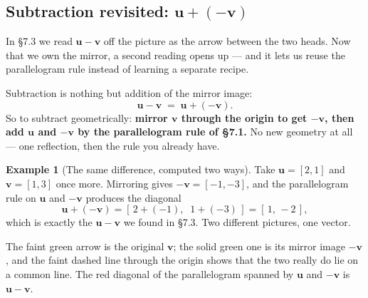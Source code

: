 \documentclass[11pt]{article}
\theoremstyle{definition}
\newtheorem{ex}{Example}
\theoremstyle{remark}
\newcommand{\vc}[1]{\mathbf{#1}}
\newcommand{\lattice}[4]{%
  \draw[step=1cm,gray!25,very thin] (#1,#3) grid (#2,#4);
  \draw[axisline] (#1,0) -- (#2+0.45,0) node[right,font=\scriptsize,black]{$x$};
  \draw[axisline] (0,#3) -- (0,#4+0.45) node[above,font=\scriptsize,black]{$y$};
}
\begin{document}
\subsection{Subtraction revisited: \texorpdfstring{$\vc{u}+(-\vc{v})$}{u + (-v)}}
In \S7.3 we read $\vc{u}-\vc{v}$ off the picture as the arrow between the two
heads. Now that we own the mirror, a second reading opens up --- and it lets us
reuse the parallelogram rule instead of learning a separate recipe.

Subtraction is nothing but addition of the mirror image:
\[
  \vc{u}-\vc{v} \;=\; \vc{u}+(-\vc{v}).
\]
So to subtract geometrically: \textbf{mirror $\vc{v}$ through the origin to get
$-\vc{v}$, then add $\vc{u}$ and $-\vc{v}$ by the parallelogram rule of \S7.1.}
No new geometry at all --- one reflection, then the rule you already have.

\begin{ex}[The same difference, computed two ways]
Take $\vc{u}=[2,1]$ and $\vc{v}=[1,3]$ once more. Mirroring gives
$-\vc{v}=[-1,-3]$, and the parallelogram rule on $\vc{u}$ and $-\vc{v}$ produces
the diagonal
\[
  \vc{u}+(-\vc{v})=[\,2+(-1),\;\;1+(-3)\,]=[\,1,\,-2\,],
\]
which is exactly the $\vc{u}-\vc{v}$ we found in \S7.3. Two different pictures,
one vector.
\end{ex}

\begin{center}
\end{center}

\noindent The faint green arrow is the original $\vc{v}$; the solid green one is
its mirror image $-\vc{v}$, and the faint dashed line through the origin shows
that the two really do lie on a common line. The red diagonal of the
parallelogram spanned by $\vc{u}$ and $-\vc{v}$ is $\vc{u}-\vc{v}$.
\end{document}
